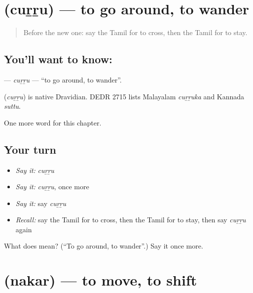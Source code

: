 \section[\texorpdfstring{\ta{சுற்று} (cuṟṟu)}{சுற்று (cuṟṟu)}]{ (cuṟṟu) — to go around, to wander}

\label{lesson:TA-C162-curru}



\begin{quote}
Before the new one: say the Tamil for to cross, then the Tamil for to stay.
\end{quote}

\subsection*{You'll want to know: }
\textbf{} — \emph{cuṟṟu} — \textquotedblleft{}to go around, to wander\textquotedblright{}.

\begin{cousinweb}
\textbf{} (\emph{cuṟṟu}) is native Dravidian. DEDR 2715 lists Malayalam \emph{cuṟṟuka} and Kannada \emph{suttu}.
\end{cousinweb}

\begin{grammarlens}[title={What you've built}]
One more word for this chapter.
\end{grammarlens}

\subsection*{Your turn}
\begin{itemize}
\raggedright
  \item \emph{Say it:} \emph{cuṟṟu}
  \item \emph{Say it:} \emph{cuṟṟu}, once more
  \item \emph{Say it:} say \emph{cuṟṟu}
  \item \emph{Recall:} say the Tamil for to cross, then the Tamil for to stay, then say \emph{cuṟṟu} again
\end{itemize}

\begin{tcolorbox}[breakable,colback=teal!4,colframe=teal!35!black,title={Before you move on}]
What does  mean? (\textquotedblleft{}To go around, to wander\textquotedblright{}.) Say it once more.
\end{tcolorbox}
\section[\texorpdfstring{\ta{நகர்} (nakar)}{நகர் (nakar)}]{ (nakar) — to move, to shift}

